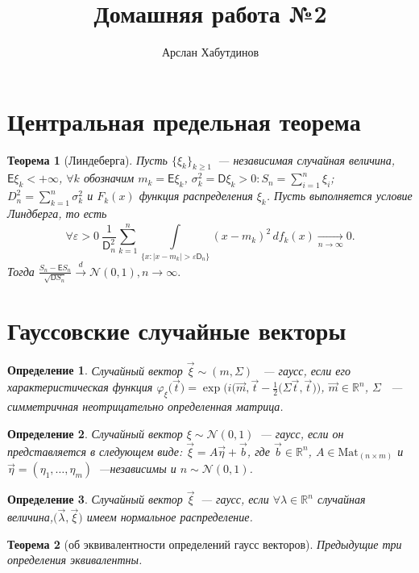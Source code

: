 \documentclass[11pt]{article}
\title{Домашняя работа №2}
\author{Арслан Хабутдинов}
\date{}
\newtheorem{thm}{Теорема}[section]
\newtheorem{dfn}{Определение}
\begin{document}
    \maketitle
    \section{Центральная предельная теорема}
    \begin{thm}[Линдеберга]
        Пусть $\{\xi_k\}_{k \geq 1}$~--- независимая случайная величина, $\mathsf{E}\xi_k < +\infty$, $\forall k$ обозначим $m_k = \mathsf{E}\xi_k$, $\sigma_k^2 = \mathsf{D}\xi_k > 0:S_n = \sum\limits_{i = 1}^n\xi_i$; $D_n^2 = \sum\limits_{k = 1}^n\sigma_k^2$ и $F_k(x)$ функция распределения $\xi_k$. Пусть выполняется условие Линдберга, то есть 
        $$
        \forall\varepsilon > 0~\frac{1}{\mathsf{D}_n^2} \sum\limits_{k = 1}^n \int\limits_{\{x:|x - m_k| > \varepsilon \mathsf{D}_n\}}^{} (x - m_k)^2  \,d f_k(x) \xrightarrow[n\rightarrow\infty]{}0.
        $$
        Тогда $\frac{S_n - \mathsf{E}S_n}{\sqrt{\mathsf{D}S_n}} \xrightarrow{d} \mathcal{N}(0,1), n \rightarrow \infty.$
    \end{thm}

    \section{Гауссовские случайные векторы}
    \begin{dfn}
        Случайный вектор $\vec \xi \sim (m, \Sigma)$ ~--- гаусс, если его характеристическая функция $\varphi_\xi\biggl(\vec t\biggr) = \exp{\biggl(i\biggl(\vec m, \vec t} - \frac{1}{2}\biggl(\Sigma \vec t, \vec t\biggr)\biggr)$, $\vec m \in \mathbb{R}^n$, $\Sigma$ ~--- симметричная неотрицательно определенная  матрица.
    \end{dfn}
    \begin{dfn}
        Случайный вектор $\xi \sim \mathcal{N}(0,1)$~--- гаусс, если он представляется в следующем виде: $\vec \xi = A\vec \eta + \vec b$, где  $\vec b \in \mathbb{R}^n$, $A \in \text{Mat}_{(n \times m)}$ и $\vec \eta = (\eta_1, \dots, \eta_m)$~---независимы и $n \sim \mathcal{N}(0,1)$.
    \end{dfn}
    \begin{dfn}
        Случайный вектор $\vec \xi$~--- гаусс, если  $\forall \lambda \in \mathbb{R}^n$ случайная величина,$\biggl(\vec\lambda, \vec\xi\biggr)$ имеем нормальное распределение.
    \end{dfn}
    \begin{thm}[об эквивалентности определений гаусс векторов]
        Предыдущие три определения эквивалентны.
    \end{thm}
\end{document}
